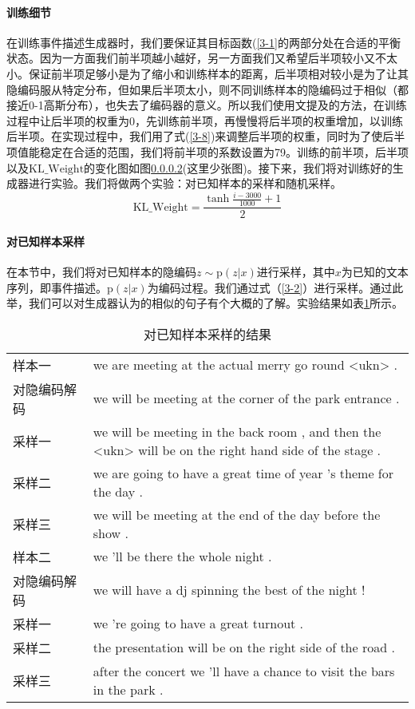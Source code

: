 \documentclass[]{template}
\begin{document}
\paragraph{训练细节}
在训练事件描述生成器时，我们要保证其目标函数(\ref{3-1}的两部分处在合适的平衡状态。因为一方面我们前半项越小越好，另一方面我们又希望后半项较小又不太小。保证前半项足够小是为了缩小和训练样本的距离，后半项相对较小是为了让其隐编码服从特定分布，但如果后半项太小，则不同训练样本的隐编码过于相似（都接近0-1高斯分布），也失去了编码器的意义。所以我们使用文提及的方法，在训练过程中让后半项的权重为0，先训练前半项，再慢慢将后半项的权重增加，以训练后半项。在实现过程中，我们用了式(\ref{3-8})来调整后半项的权重，同时为了使后半项值能稳定在合适的范围，我们将前半项的系数设置为79。训练的前半项，后半项以及$\mathrm{KL\_Weight}$的变化图如图\ref{}(这里少张图)。接下来，我们将对训练好的生成器进行实验。我们将做两个实验：对已知样本的采样和随机采样。
\begin{equation}\label{3-8}
    \mathrm{KL\_Weight}=\frac{\tanh\frac{i-3000}{1000}+1}{2}
\end{equation}

\paragraph{对已知样本采样}  
在本节中，我们将对已知样本的隐编码$z \sim \mathrm{p}(z|x)$进行采样，其中$x$为已知的文本序列，即事件描述。$\mathrm{p}(z|x)$为编码过程。我们通过式（\ref{3-2}）进行采样。通过此举，我们可以对生成器认为的相似的句子有个大概的了解。实验结果如表\ref{t3-2}所示。 
\begin{table}[htbp]
    \center
    \caption{\label{t3-2}对已知样本采样的结果}
    \begin{tabular*}{\linewidth}{p{0.2\linewidth}p{0.8\linewidth}}
\toprule
样本一 & we are meeting at the actual merry go round <ukn> . \\
对隐编码解码 & we will be meeting at the corner of the park entrance .\\ 
采样一 & we will be meeting in the back room , and then the <ukn> will be on the right hand side of the stage .\\
采样二 & we are going to have a great time of year 's theme for the day . \\
采样三 & we will be meeting at the end of the day before the show . \\
\midrule
样本二 & we 'll be there the whole night . \\
对隐编码解码 & we will have a dj spinning the best of the night !\\ 
采样一 & we 're going to have a great turnout .\\
采样二 & the presentation will be on the right side of the road .\\
采样三 & after the concert we 'll have a chance to visit the bars in the park . \\
\bottomrule
    \end{tabular*}
\end{table}
\end{document}
